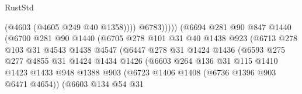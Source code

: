 \begin{lexlean}{RustStd}
\begin{coremodule}
                                              (@4603 (@4605 @249 @40 @1358))))
                                          @6783)))))
                                (@6694
                                  @281
                                  @90
                                  @847
                                  @1440
                                  (@6700
                                    @281
                                    @90
                                    @1440
                                    (@6705
                                      @278
                                      @101
                                      @31
                                      @40
                                      @1438
                                      @923
                                      (@6713
                                        @278
                                        @103
                                        @31
                                        @4543
                                        @1438
                                        @4547
                                        (@6447
                                          @278
                                          @31
                                          @1424
                                          @1436
                                          (@6593
                                            @275
                                            @277
                                            @4855
                                            @31
                                            @1424
                                            @1434
                                            @1426
                                            (@6603
                                              @264
                                              @136
                                              @31
                                              @115
                                              @1410
                                              @1423
                                              @1433
                                              @948
                                              @1388
                                              @903
                                              (@6723 @1406 @1408 (@6736 @1396 @903 @6471 @4654))
                                              (@6603
                                                @134
                                                @54
                                                @31

\end{coremodule}
\end{lexlean}
